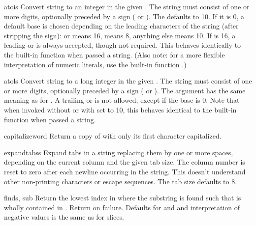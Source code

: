 \begin{funcdesc}{atoi}{s}
  Convert string  to an integer in the given .  The
  string must consist of one or more digits, optionally preceded by a
  sign (\samp{+} or \samp{-}).  The  defaults to 10.  If it
  is 0, a default base is chosen depending on the leading characters
  of the string (after stripping the sign):  or 
  means 16,  means 8, anything else means 10.  If 
  is 16, a leading  or  is always accepted, though
  not required.  This behaves identically to the built-in function
   when passed a string.  (Also note: for a more
  flexible interpretation of numeric literals, use the built-in
  function .)
\end{funcdesc}

\begin{funcdesc}{atol}{s}
  Convert string  to a long integer in the given .
  The string must consist of one or more digits, optionally preceded
  by a sign (\samp{+} or \samp{-}).  The  argument has the
  same meaning as for .  A trailing  or
   is not allowed, except if the base is 0.  Note that when
  invoked without  or with  set to 10, this
  behaves identical to the built-in function
   when passed a string.
\end{funcdesc}

\begin{funcdesc}{capitalize}{word}
  Return a copy of  with only its first character capitalized.
\end{funcdesc}

\begin{funcdesc}{expandtabs}{s}
  Expand tabs in a string replacing them by one or more spaces,
  depending on the current column and the given tab size.  The column
  number is reset to zero after each newline occurring in the string.
  This doesn't understand other non-printing characters or escape
  sequences.  The tab size defaults to 8.
\end{funcdesc}

\begin{funcdesc}{find}{s, sub}
  Return the lowest index in  where the substring  is
  found such that  is wholly contained in
  .  Return  on failure.
  Defaults for  and  and interpretation of
  negative values is the same as for slices.
\end{funcdesc}

